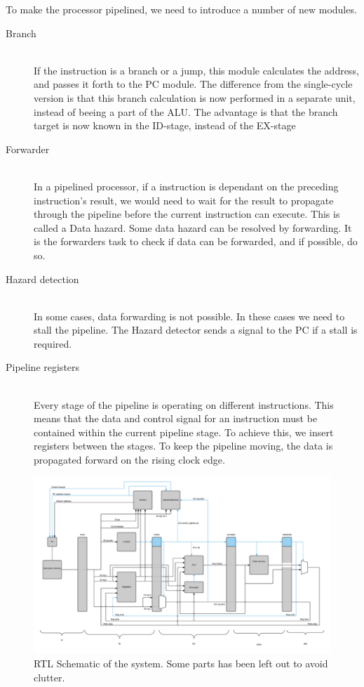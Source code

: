 To make the processor pipelined, we need to introduce a number of new modules.

\begin{description}
  \item[Branch] \hfill \\
  If the instruction is a branch or a jump, this module calculates the address, and passes it forth to the PC module. The difference from the single-cycle version is that this  branch calculation is now performed in a separate unit, instead of beeing a part of the ALU. The advantage is that the branch target is now known in the ID-stage, instead of the EX-stage 
  \item[Forwarder] \hfill \\
  In a pipelined processor, if a instruction is dependant on the preceding instruction's result, we would need to wait for the result to propagate through the pipeline before the current instruction can execute. This is called a Data hazard. Some data hazard can be resolved by forwarding. It is the forwarders task to check if data can be forwarded, and if possible, do so.
  \item[Hazard detection] \hfill \\
  In some cases, data forwarding is not possible. In these cases we need to stall the pipeline. The Hazard detector sends a signal to the PC if a stall is required.
  \item[Pipeline registers] \hfill \\
  Every stage of the pipeline is operating on different instructions. This means that the data and control signal for an instruction must be contained within the current pipeline stage. To achieve this, we insert registers between the stages. To keep the pipeline moving, the data is propagated forward on the rising clock edge. 
\end{description}

\begin{figure}[h!]
    \includegraphics[width=\linewidth]{img/toplel.png}
    \caption{RTL Schematic of the system. Some parts has been left out to avoid clutter.}
    \label{fig:toplevel}
\end{figure}


